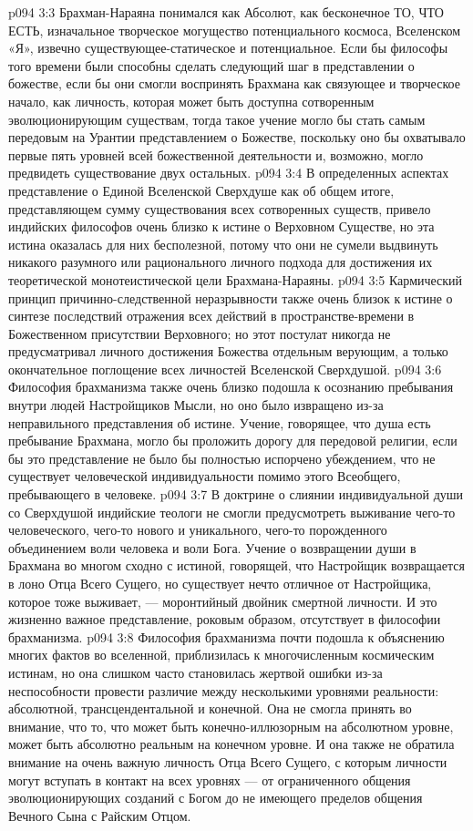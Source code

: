 \vs p094 3:3 Брахман\hyp{}Нараяна понимался как Абсолют, как бесконечное ТО, ЧТО ЕСТЬ, изначальное творческое могущество потенциального космоса, Вселенском «Я», извечно существующее\hyp{}статическое и потенциальное. Если бы философы того времени были способны сделать следующий шаг в представлении о божестве, если бы они смогли воспринять Брахмана как связующее и творческое начало, как личность, которая может быть доступна сотворенным эволюционирующим существам, тогда такое учение могло бы стать самым передовым на Урантии представлением о Божестве, поскольку оно бы охватывало первые пять уровней всей божественной деятельности и, возможно, могло предвидеть существование двух остальных.
\vs p094 3:4 В определенных аспектах представление о Единой Вселенской Сверхдуше как об общем итоге, представляющем сумму существования всех сотворенных существ, привело индийских философов очень близко к истине о Верховном Существе, но эта истина оказалась для них бесполезной, потому что они не сумели выдвинуть никакого разумного или рационального личного подхода для достижения их теоретической монотеистической цели Брахмана\hyp{}Нараяны.
\vs p094 3:5 Кармический принцип причинно\hyp{}следственной неразрывности также очень близок к истине о синтезе последствий отражения всех действий в пространстве\hyp{}времени в Божественном присутствии Верховного; но этот постулат никогда не предусматривал личного достижения Божества отдельным верующим, а только окончательное поглощение всех личностей Вселенской Сверхдушой.
\vs p094 3:6 Философия брахманизма также очень близко подошла к осознанию пребывания внутри людей Настройщиков Мысли, но оно было извращено из\hyp{}за неправильного представления об истине. Учение, говорящее, что душа есть пребывание Брахмана, могло бы проложить дорогу для передовой религии, если бы это представление не было бы полностью испорчено убеждением, что не существует человеческой индивидуальности помимо этого Всеобщего, пребывающего в человеке.
\vs p094 3:7 В доктрине о слиянии индивидуальной души со Сверхдушой индийские теологи не смогли предусмотреть выживание чего\hyp{}то человеческого, чего\hyp{}то нового и уникального, чего\hyp{}то порожденного объединением воли человека и воли Бога. Учение о возвращении души в Брахмана во многом сходно с истиной, говорящей, что Настройщик возвращается в лоно Отца Всего Сущего, но существует нечто отличное от Настройщика, которое тоже выживает, --- моронтийный двойник смертной личности. И это жизненно важное представление, роковым образом, отсутствует в философии брахманизма.
\vs p094 3:8 Философия брахманизма почти подошла к объяснению многих фактов во вселенной, приблизилась к многочисленным космическим истинам, но она слишком часто становилась жертвой ошибки из\hyp{}за неспособности провести различие между несколькими уровнями реальности: абсолютной, трансцендентальной и конечной. Она не смогла принять во внимание, что то, что может быть конечно\hyp{}иллюзорным на абсолютном уровне, может быть абсолютно реальным на конечном уровне. И она также не обратила внимание на очень важную личность Отца Всего Сущего, с которым личности могут вступать в контакт на всех уровнях --- от ограниченного общения эволюционирующих созданий с Богом до не имеющего пределов общения Вечного Сына с Райским Отцом.
